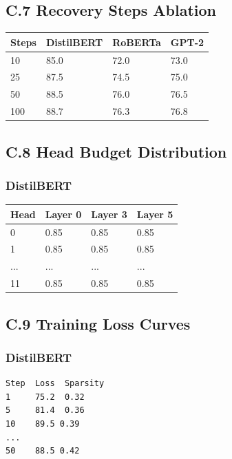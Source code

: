 \subsection{C.7 Recovery Steps Ablation}

\begin{table}[H]
\centering
\small
\begin{tabular}{llll}
\toprule
\textbf{Steps} & \textbf{DistilBERT} & \textbf{RoBERTa} & \textbf{GPT-2} \\
\midrule
10 & 85.0 & 72.0 & 73.0 \\
25 & 87.5 & 74.5 & 75.0 \\
50 & 88.5 & 76.0 & 76.5 \\
100 & 88.7 & 76.3 & 76.8 \\
\bottomrule
\end{tabular}
\end{table}

\subsection{C.8 Head Budget Distribution}

\subsubsection{DistilBERT}
\begin{table}[H]
\centering
\small
\begin{tabular}{llll}
\toprule
\textbf{Head} & \textbf{Layer 0} & \textbf{Layer 3} & \textbf{Layer 5} \\
\midrule
0 & 0.85 & 0.85 & 0.85 \\
1 & 0.85 & 0.85 & 0.85 \\
... & ... & ... & ... \\
11 & 0.85 & 0.85 & 0.85 \\
\bottomrule
\end{tabular}
\end{table}

\subsection{C.9 Training Loss Curves}

\subsubsection{DistilBERT}
\begin{lstlisting}
Step  Loss  Sparsity
1     75.2  0.32
5     81.4  0.36
10    89.5 0.39
...
50    88.5 0.42
\end{lstlisting}

